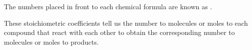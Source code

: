 The numbers placed in front to each chemical formula are known as .
\vspace*{12pt}
%
%
%
%
\begin{centeredequation}
\end{centeredequation}
\vspace{8pt}

These stoichiometric coefficients tell us the number to molecules or moles to each compound that react with each other to obtain the corresponding number to molecules or moles to products.


